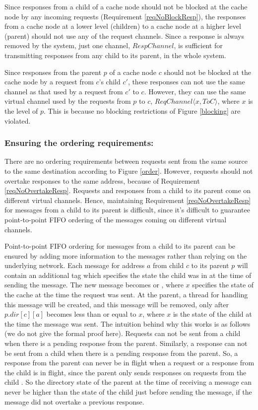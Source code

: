 Since responses from a child of a cache node should not be blocked at the cache
node by any incoming requests (Requirement \ref{reqNoBlockResp}), the responses
from a cache node at a lower level (children) to a cache node at a higher level
(parent) should not use any of the request channels. Since a
response is always removed by the system, just one channel, $RespChannel$, is
sufficient for transmitting responses from any child to its parent, in the
whole system.

Since responses from the parent $p$ of a cache node $c$ should not be blocked
at the cache node by a request from $c$'s child $c'$, these responses can not
use the same channel as that used by a request from $c'$ to $c$. However, they
can use the same virtual channel used by the requests from $p$ to $c$,
$ReqChannel\langle x, ToC \rangle$, where $x$ is the level of $p$. This is
because no blocking restrictions of Figure \ref{blocking} are violated.

\subsubsection{Ensuring the ordering requirements:}
There are no ordering requirements between requests sent from the same source
to the same destination according to Figure \ref{order}.  However, requests
should not overtake responses to the same address, because of Requirement
\ref{reqNoOvertakeResp}. Requests and responses from a child to its parent come
on different virtual channels. Hence, maintaining Requirement
\ref{reqNoOvertakeResp} for messages from a child to its parent is difficult,
since it's difficult to guarantee point-to-point FIFO ordering of the messages
coming on different virtual channels.

Point-to-point FIFO ordering for messages from a child to its parent can be
ensured by adding more information to the messages rather than relying on the
underlying network. Each message for address $a$ from child $c$ to its parent
$p$ will contain an additional tag which specifies the state the child was in
at the time of sending the message. The new message becomes  or , where $x$ specifies the
state of the cache at the time the request was sent. At the parent, a thread
for handling this message will be created, and this message will be removed,
only after $p.dir[c][a]$ becomes less than or equal to $x$, where $x$ is the
state of the child at the time the message was sent. The intuition behind why
this works is as follows (we do not give the formal proof here). Requests can
not be sent from a child when there is a pending response from the parent. Similarly, a response can not be sent from
a child when there is a pending response from the parent. So, a response from the parent can never be in flight
when a request or a response from the child is in flight, since the
parent only sends responses on requests from the child . So the directory state of the parent at the time of
receiving a message can never be higher than the state of the child just before
sending the message, if the message did not overtake a previous response.

